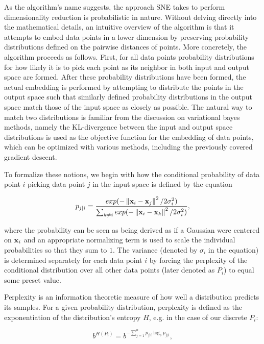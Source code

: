 As the algorithm's name suggests, the approach SNE takes to perform dimensionality reduction is probabilistic in nature. Without delving directly into the mathematical details, an intuitive overview of the algorithm is that it attempts to embed data points in a lower dimension by preserving probability distributions defined on the pairwise distances of points. More concretely, the algorithm proceeds as follows. First, for all data points probability distributions for how likely it is to pick each point as its neighbor in both input and output space are formed. After these probability distributions have been formed, the actual embedding is performed by attempting to distribute the points in the output space such that similarly defined probability distributions in the output space match those of the input space as closely as possible. The natural way to match two distributions is familiar from the discussion on variational bayes methods, namely the KL-divergence between the input and output space distributions is used as the objective function for the embedding of data points, which can be optimized with various methods, including the previously covered gradient descent.

To formalize these notions, we begin with how the conditional probability of data point $i$ picking data point $j$ in the input space is defined by the equation

\begin{equation}
p_{j \vert i} = \frac{exp(-\left\lVert\mathbf{x}_i - \mathbf{x}_j\right\rVert^2 / 2 \sigma_i^2)}{\sum_{k \neq i} exp(-\left\lVert\mathbf{x}_i - \mathbf{x}_k\right\rVert^2 / 2 \sigma_i^2)},
\label{eq:p_j_c_i}
\end{equation}

where the probability can be seen as being derived as if a Gaussian were centered on $\mathbf{x}_i$ and an appropriate normalizing term is used to scale the individual probabilities so that they sum to $1$. The variance (denoted by $\sigma_i$ in the equation) is determined separately for each data point $i$ by forcing the perplexity of the conditional distribution over all other data points (later denoted as $P_i$) to equal some preset value.

Perplexity is an information theoretic measure of how well a distribution predicts its samples. For a given probability distribution, perplexity is defined as the exponentiation of the distribution's entropy $H$, e.g. in the case of our discrete $P_i$:

$$b^{H(P_i)} = b^{-\sum_{j=1}^{n} p_{j \vert i} \log_b p_{j \vert i}},$$

